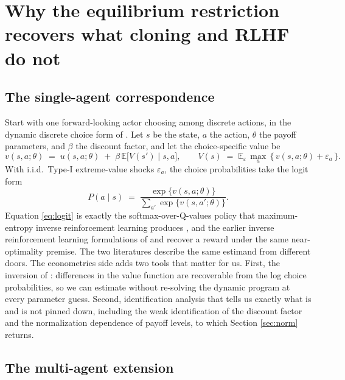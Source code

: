 \documentclass[11pt]{article}
\theoremstyle{definition}
\begin{document}
\section{Why the equilibrium restriction recovers what cloning and RLHF do not}

\subsection{The single-agent correspondence}

Start with one forward-looking actor choosing among discrete actions, in the dynamic discrete choice form of \citet{rust1987}. Let $s$ be the state, $a$ the action, $\theta$ the payoff parameters, and $\beta$ the discount factor, and let the choice-specific value be
\begin{equation}
v(s,a;\theta) \;=\; u(s,a;\theta) \;+\; \beta\, \mathbb{E}\big[V(s') \mid s,a\big],
\qquad
V(s) \;=\; \mathbb{E}_{\varepsilon}\,\max_{a}\,\{\,v(s,a;\theta) + \varepsilon_a\,\}.
\end{equation}
With i.i.d.\ Type-I extreme-value shocks $\varepsilon_a$, the choice probabilities take the logit form
\begin{equation}
P(a\mid s) \;=\; \frac{\exp\{v(s,a;\theta)\}}{\sum_{a'}\exp\{v(s,a';\theta)\}}.
\label{eq:logit}
\end{equation}
Equation \eqref{eq:logit} is exactly the softmax-over-Q-values policy that maximum-entropy inverse reinforcement learning produces \citep{ziebart2008}, and the earlier inverse reinforcement learning formulations of \citet{ngRussell2000} and \citet{abbeelNg2004} recover a reward under the same near-optimality premise. The two literatures describe the same estimand from different doors. The econometrics side adds two tools that matter for us. First, the inversion of \citet{hotzMiller1993}: differences in the value function are recoverable from the log choice probabilities, so we can estimate without re-solving the dynamic program at every parameter guess. Second, identification analysis \citep{magnacThesmar2002} that tells us exactly what is and is not pinned down, including the weak identification of the discount factor and the normalization dependence of payoff levels, to which Section \ref{sec:norm} returns.

\subsection{The multi-agent extension}
\end{document}
